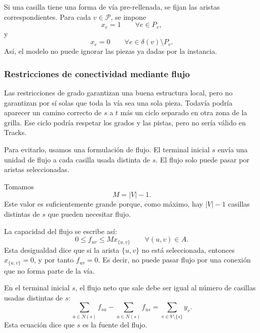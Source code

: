 Si una casilla tiene una forma de vía pre-rellenada, se fijan las aristas correspondientes. Para cada \(v \in \mathcal{P}\), se impone
\begin{equation}
    x_e = 1
    \qquad \forall e \in P_v,
    \label{eq:es-fixed-pattern-on}
\end{equation}
y
\begin{equation}
    x_e = 0
    \qquad \forall e \in \delta(v)\setminus P_v.
    \label{eq:es-fixed-pattern-off}
\end{equation}
Así, el modelo no puede ignorar las piezas ya dadas por la instancia.

\subsubsection{Restricciones de conectividad mediante flujo}

Las restricciones de grado garantizan una buena estructura local, pero no garantizan por sí solas que toda la vía sea una sola pieza. Todavía podría aparecer un camino correcto de \(s\) a \(t\) más un ciclo separado en otra zona de la grilla. Ese ciclo podría respetar los grados y las pistas, pero no sería válido en Tracks.

Para evitarlo, usamos una formulación de flujo. El terminal inicial \(s\) envía una unidad de flujo a cada casilla usada distinta de \(s\). El flujo solo puede pasar por aristas seleccionadas.

Tomamos
\[
    M = |V|-1.
\]
Este valor es suficientemente grande porque, como máximo, hay \(|V|-1\) casillas distintas de \(s\) que pueden necesitar flujo.

La capacidad del flujo se escribe así:
\begin{equation}
    0 \leq f_{uv} \leq M x_{\{u,v\}}
    \qquad \forall (u,v) \in A.
    \label{eq:es-flow-capacity}
\end{equation}
Esta desigualdad dice que si la arista \(\{u,v\}\) no está seleccionada, entonces \(x_{\{u,v\}}=0\), y por tanto \(f_{uv}=0\). Es decir, no puede pasar flujo por una conexión que no forma parte de la vía.

En el terminal inicial \(s\), el flujo neto que sale debe ser igual al número de casillas usadas distintas de \(s\):
\begin{equation}
    \sum_{u \in N(s)} f_{su}
    -
    \sum_{u \in N(s)} f_{us}
    =
    \sum_{v \in V \setminus \{s\}} y_v.
    \label{eq:es-flow-source}
\end{equation}
Esta ecuación dice que \(s\) es la fuente del flujo.

